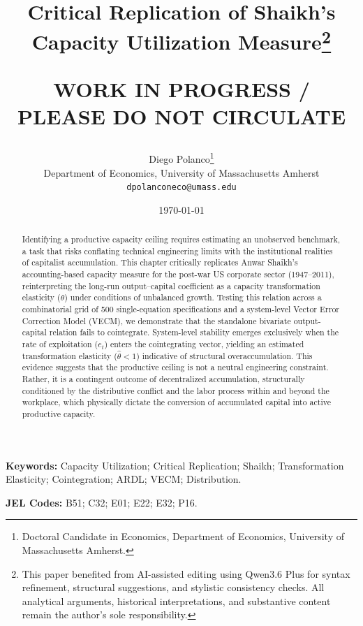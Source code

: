 \documentclass[11pt]{article}
\title{Critical Replication of Shaikh's Capacity Utilization Measure\thanks{This paper benefited from AI-assisted editing using Qwen3.6 Plus for syntax refinement, structural suggestions, and stylistic consistency checks. All analytical arguments, historical interpretations, and substantive content remain the author's sole responsibility.}\\
\begin{large}
\textbf{WORK IN PROGRESS / PLEASE DO NOT CIRCULATE}     
\end{large}
}
\author{Diego Polanco\thanks{Doctoral Candidate in Economics, Department of Economics, University of Massachusetts Amherst.}\\
Department of Economics, University of Massachusetts Amherst\\
\texttt{dpolanconeco@umass.edu}}
\date{\today}
\begin{document}
\maketitle


\begin{abstract}
Identifying a productive capacity ceiling requires estimating an unobserved  benchmark, a task that risks conflating technical engineering limits with the institutional realities of capitalist accumulation. This chapter critically replicates Anwar Shaikh’s accounting-based capacity measure for the post-war US corporate sector (1947–2011), reinterpreting the long-run output–capital coefficient as a capacity transformation elasticity ($\theta$) under conditions of unbalanced growth. Testing this relation across a combinatorial grid of 500 single-equation specifications and a system-level Vector Error Correction Model (VECM), we demonstrate that the standalone bivariate output-capital relation fails to cointegrate. System-level stability emerges exclusively when the rate of exploitation ($e_t$) enters the cointegrating vector, yielding an estimated transformation elasticity ($\hat{\theta} < 1$) indicative of structural overaccumulation. This evidence suggests that the productive ceiling is not a neutral engineering constraint. Rather, it is a contingent outcome of decentralized accumulation, structurally conditioned by the distributive conflict and the labor process within and beyond the workplace, which physically dictate the conversion of accumulated capital into active productive capacity.
\end{abstract}


\vspace{1cm}

\noindent\textbf{Keywords:} Capacity Utilization; Critical Replication; Shaikh; Transformation Elasticity; Cointegration; ARDL; VECM; Distribution.

\noindent\textbf{JEL Codes:} B51; C32; E01; E22; E32; P16.

\pagebreak







\pagebreak


\pagebreak
\appendix

\pagebreak

\end{document}
